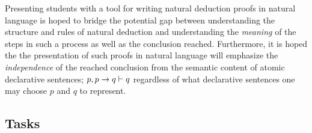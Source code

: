 \documentclass[a4paper]{article}
\begin{document}
    Presenting students with a tool for writing natural deduction proofs
    in natural language is hoped to bridge the potential gap between
    understanding the structure and rules of natural deduction and
    understanding the \emph{meaning} of the steps in such a process as well
    as the conclusion reached. Furthermore, it is hoped the the
    presentation of such proofs in natural language will emphasize the
    \emph{independence} of the reached conclusion from the semantic 
    content of atomic declarative sentences; \(p, p \rightarrow q \vdash q\)
    regardless
    of what declarative sentences one may choose $p$ and $q$ to represent.

\subsection{Tasks}
\end{document}
